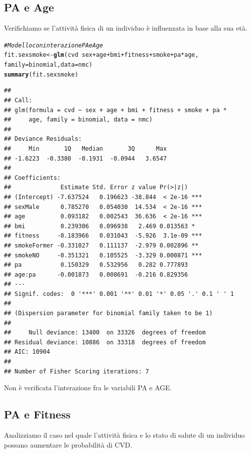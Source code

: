 \documentclass{article}\usepackage[]{graphicx}\usepackage[]{xcolor}
\makeatletter
\newcommand{\hlcom}[1]{\textcolor[rgb]{0.678,0.584,0.686}{\textit{#1}}}%
\newcommand{\hlopt}[1]{\textcolor[rgb]{0,0,0}{#1}}%
\newcommand{\hlstd}[1]{\textcolor[rgb]{0.345,0.345,0.345}{#1}}%
\newcommand{\hlkwb}[1]{\textcolor[rgb]{0.69,0.353,0.396}{#1}}%
\newcommand{\hlkwc}[1]{\textcolor[rgb]{0.333,0.667,0.333}{#1}}%
\newcommand{\hlkwd}[1]{\textcolor[rgb]{0.737,0.353,0.396}{\textbf{#1}}}%
\newenvironment{kframe}{%
 \def\at@end@of@kframe{}%
 \ifinner\ifhmode%
  \def\at@end@of@kframe{\end{minipage}}%
  \begin{minipage}{\columnwidth}%
 \fi\fi%
 \def\FrameCommand##1{\hskip\@totalleftmargin \hskip-\fboxsep
 \colorbox{shadecolor}{##1}\hskip-\fboxsep
     \hskip-\linewidth \hskip-\@totalleftmargin \hskip\columnwidth}%
 \MakeFramed {\advance\hsize-\width
   \@totalleftmargin\z@ \linewidth\hsize
   \@setminipage}}%
 {\par\unskip\endMakeFramed%
 \at@end@of@kframe}
\newenvironment{knitrout}{}{} %
\makeatother
\begin{document}
  \subsection{PA e Age}
    Verifichiamo se l'attività fisica di un individuo è influenzata in base
    alla sua età.
\begin{knitrout}
\color{fgcolor}\begin{kframe}
\begin{alltt}
\hlcom{#Modello con interazione PA e Age}
\hlstd{fit.sexsmoke} \hlkwb{<-} \hlkwd{glm}\hlstd{(cvd}\hlopt{~}\hlstd{sex}\hlopt{+}\hlstd{age}\hlopt{+}\hlstd{bmi}\hlopt{+}\hlstd{fitness}\hlopt{+}\hlstd{smoke}\hlopt{+}\hlstd{pa}\hlopt{*}\hlstd{age,}
                    \hlkwc{family}\hlstd{=binomial,} \hlkwc{data}\hlstd{=nmc)}
\hlkwd{summary}\hlstd{(fit.sexsmoke)}
\end{alltt}
\begin{verbatim}
## 
## Call:
## glm(formula = cvd ~ sex + age + bmi + fitness + smoke + pa * 
##     age, family = binomial, data = nmc)
## 
## Deviance Residuals: 
##     Min       1Q   Median       3Q      Max  
## -1.6223  -0.3380  -0.1931  -0.0944   3.6547  
## 
## Coefficients:
##              Estimate Std. Error z value Pr(>|z|)    
## (Intercept) -7.637524   0.196623 -38.844  < 2e-16 ***
## sexMale      0.785270   0.054030  14.534  < 2e-16 ***
## age          0.093182   0.002543  36.636  < 2e-16 ***
## bmi          0.239306   0.096938   2.469 0.013563 *  
## fitness     -0.183966   0.031043  -5.926  3.1e-09 ***
## smokeFormer -0.331027   0.111137  -2.979 0.002896 ** 
## smokeNO     -0.351321   0.105525  -3.329 0.000871 ***
## pa           0.150329   0.532956   0.282 0.777893    
## age:pa      -0.001873   0.008691  -0.216 0.829356    
## ---
## Signif. codes:  0 '***' 0.001 '**' 0.01 '*' 0.05 '.' 0.1 ' ' 1
## 
## (Dispersion parameter for binomial family taken to be 1)
## 
##     Null deviance: 13400  on 33326  degrees of freedom
## Residual deviance: 10886  on 33318  degrees of freedom
## AIC: 10904
## 
## Number of Fisher Scoring iterations: 7
\end{verbatim}
\end{kframe}
\end{knitrout}
    
    Non è verificata l'interazione fra le variabili PA e AGE.
  
  \clearpage
    
  \subsection{PA e Fitness}
    Analizziamo il caso nel quale l'attività fisica e lo stato di salute di un
    individuo possano aumentare le probabilità di CVD.
    
\end{document}
